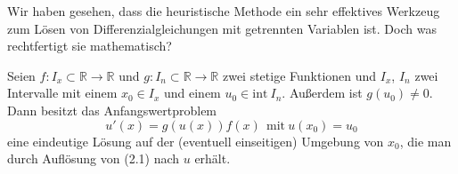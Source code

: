 Wir haben gesehen, dass die heuristische Methode ein sehr 
effektives Werkzeug zum Lösen von Differenzialgleichungen 
mit getrennten Variablen ist. Doch was rechtfertigt sie 
mathematisch?\newpage

\begin{satz}
Seien $f:I_x\subset\mathbb{R}\rightarrow\mathbb{R}$ und 
$g:I_n\subset\mathbb{R}\rightarrow\mathbb{R}$ zwei stetige 
Funktionen und $I_x$, $I_n$ zwei Intervalle mit einem $x_0\in I_x$ 
und einem $u_0\in\mathrm{int\ } I_n$. Außerdem ist 
$g(u_0)\neq 0$.\\
Dann besitzt das Anfangswertproblem
\begin{equation*}
u'(x)=g(u(x))f(x) \ \ \mathrm{mit\ }u(x_0)=u_0
\end{equation*}
eine eindeutige Lösung auf der (eventuell einseitigen) Umgebung 
von $x_0$, die man durch Auflösung von (2.1) nach $u$ erhält.
\end{satz}

